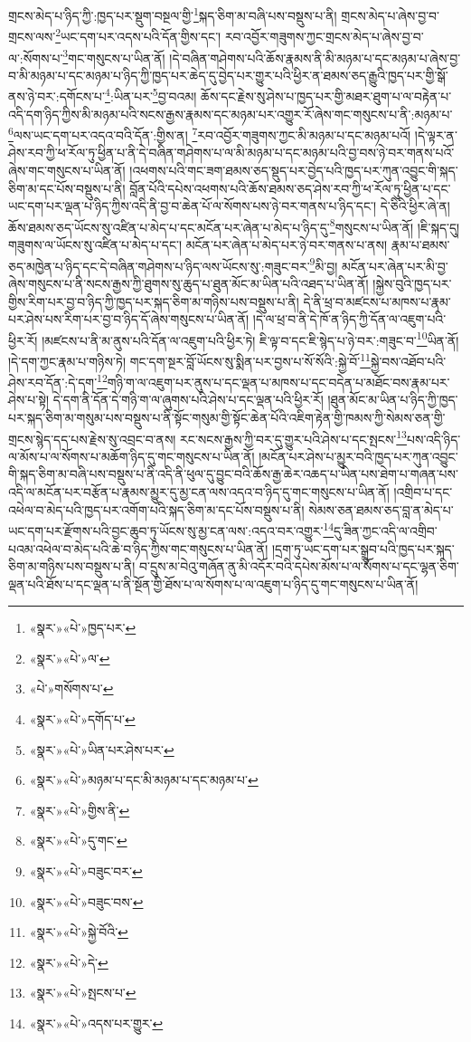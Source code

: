 གྲངས་མེད་པ་ཉིད་ཀྱི་:ཁྱད་པར་སྡུག་བསྔལ་གྱི་\footnote{«སྣར་»«པེ་»ཁྱད་པར་}སྐད་ཅིག་མ་བཞི་པས་བསྡུས་པ་ནི། གྲངས་མེད་པ་ཞེས་བྱ་བ་གྲངས་ལས་\footnote{«སྣར་»«པེ་»ལ་}ཡང་དག་པར་འདས་པའི་དོན་གྱིས་དང་། རབ་འབྱོར་གཟུགས་ཀྱང་གྲངས་མེད་པ་ཞེས་བྱ་བ་ལ་:སོགས་པ་\footnote{«པེ་»གསོགས་པ་}གང་གསུངས་པ་ཡིན་ནོ། །དེ་བཞིན་གཤེགས་པའི་ཆོས་རྣམས་ནི་མི་མཉམ་པ་དང་མཉམ་པ་ཞེས་བྱ་བ་མི་མཉམ་པ་དང་མཉམ་པ་ཉིད་ཀྱི་ཁྱད་པར་ཆེད་དུ་བྱེད་པར་གྱུར་པའི་ཕྱིར་ན་ཐམས་ཅད་རྒྱུའི་ཁྱད་པར་གྱི་སྒོ་ནས་ཉེ་བར་:དགོངས་པ་\footnote{«སྣར་»«པེ་»དགོད་པ་}:ཡིན་པར་\footnote{«སྣར་»«པེ་»ཡིན་པར་ཤེས་པར་}བྱ་བའམ། ཆོས་དང་རྗེས་སུ་ཤེས་པ་ཁྱད་པར་གྱི་མཐར་ཐུག་པ་ལ་བརྟེན་པ་འདི་དག་ཉིད་ཀྱིས་མི་མཉམ་པའི་སངས་རྒྱས་རྣམས་དང་མཉམ་པར་འགྱུར་རོ་ཞེས་གང་གསུངས་པ་ནི་:མཉམ་པ་\footnote{«སྣར་»«པེ་»མཉམ་པ་དང་མི་མཉམ་པ་དང་མཉམ་པ་}ལས་ཡང་དག་པར་འདའ་བའི་དོན་:གྱིས་ན། \footnote{«སྣར་»«པེ་»གྱིས་ནི་}རབ་འབྱོར་གཟུགས་ཀྱང་མི་མཉམ་པ་དང་མཉམ་པའོ། །དེ་ལྟར་ན་ཤེས་རབ་ཀྱི་ཕ་རོལ་ཏུ་ཕྱིན་པ་ནི་དེ་བཞིན་གཤེགས་པ་ལ་མི་མཉམ་པ་དང་མཉམ་པའི་བྱ་བས་ཉེ་བར་གནས་པའོ་ཞེས་གང་གསུངས་པ་ཡིན་ནོ། །འཕགས་པའི་གང་ཟག་ཐམས་ཅད་སྡུད་པར་བྱེད་པའི་ཁྱད་པར་ཀུན་འབྱུང་གི་སྐད་ཅིག་མ་དང་པོས་བསྡུས་པ་ནི། བློན་པོའི་དཔེས་འཕགས་པའི་ཆོས་ཐམས་ཅད་ཤེས་རབ་ཀྱི་ཕ་རོལ་ཏུ་ཕྱིན་པ་དང་ཡང་དག་པར་ལྡན་པ་ཉིད་ཀྱིས་འདི་ནི་བྱ་བ་ཆེན་པོ་ལ་སོགས་པས་ཉེ་བར་གནས་པ་ཉིད་དང་། དེ་ཅིའི་ཕྱིར་ཞེ་ན། ཆོས་ཐམས་ཅད་ཡོངས་སུ་འཛིན་པ་མེད་པ་དང་མངོན་པར་ཞེན་པ་མེད་པ་ཉིད་དུ་\footnote{«སྣར་»«པེ་»དུ་གང་}གསུངས་པ་ཡིན་ནོ། །ཇི་སྐད་དུ། གཟུགས་ལ་ཡོངས་སུ་འཛིན་པ་མེད་པ་དང་། མངོན་པར་ཞེན་པ་མེད་པར་ཉེ་བར་གནས་པ་ནས། རྣམ་པ་ཐམས་ཅད་མཁྱེན་པ་ཉིད་དང་དེ་བཞིན་གཤེགས་པ་ཉིད་ལས་ཡོངས་སུ་:གཟུང་བར་\footnote{«སྣར་»«པེ་»བཟུང་བར་}མི་བྱ། མངོན་པར་ཞེན་པར་མི་བྱ་ཞེས་གསུངས་པ་ནི་སངས་རྒྱས་ཀྱི་ཐུགས་སུ་ཆུད་པ་ཐུན་མོང་མ་ཡིན་པའི་འཐད་པ་ཡིན་ནོ། །སྐྱེས་བུའི་ཁྱད་པར་གྱིས་རིག་པར་བྱ་བ་ཉིད་ཀྱི་ཁྱད་པར་སྐད་ཅིག་མ་གཉིས་པས་བསྡུས་པ་ནི། དེ་ནི་ཕྲ་བ་མཛངས་པ་མཁས་པ་རྣམ་པར་ཤེས་པས་རིག་པར་བྱ་བ་ཉིད་དོ་ཞེས་གསུངས་པ་ཡིན་ནོ། །དེ་ལ་ཕྲ་བ་ནི་དེ་ཁོ་ན་ཉིད་ཀྱི་དོན་ལ་འཇུག་པའི་ཕྱིར་རོ། །མཛངས་པ་ནི་མ་ནུས་པའི་དོན་ལ་འཇུག་པའི་ཕྱིར་ཏེ། ཇི་ལྟ་བ་དང་ཇི་སྙེད་པ་ཉེ་བར་:གཟུང་བ་\footnote{«སྣར་»«པེ་»བཟུང་བས་}ཡིན་ནོ། །དེ་དག་ཀྱང་རྣམ་པ་གཉིས་ཏེ། གང་དག་སྔར་བློ་ཡོངས་སུ་སྨིན་པར་བྱས་པ་སོ་སོའི་:སྐྱེ་བོ་\footnote{«སྣར་»«པེ་»སྐྱེ་བོའི་}སྐྱེ་བས་འཐོབ་པའི་ཤེས་རབ་དོན་:དེ་དག་\footnote{«སྣར་»«པེ་»དེ་}གཉི་ག་ལ་འཇུག་པར་ནུས་པ་དང་ལྡན་པ་མཁས་པ་དང་བདེན་པ་མཐོང་བས་རྣམ་པར་ཤེས་པ་སྟེ། དེ་དག་ནི་དོན་དེ་གཉི་ག་ལ་ཞུགས་པའི་ཤེས་པ་དང་ལྡན་པའི་ཕྱིར་རོ། །ཐུན་མོང་མ་ཡིན་པ་ཉིད་ཀྱི་ཁྱད་པར་སྐད་ཅིག་མ་གསུམ་པས་བསྡུས་པ་ནི་སྟོང་གསུམ་གྱི་སྟོང་ཆེན་པོའི་འཇིག་རྟེན་གྱི་ཁམས་ཀྱི་སེམས་ཅན་གྱི་གྲངས་སྙེད་དད་པས་རྗེས་སུ་འབྲང་བ་ནས། རང་སངས་རྒྱས་ཀྱི་བར་དུ་གྱུར་པའི་ཤེས་པ་དང་སྤངས་\footnote{«སྣར་»«པེ་»སྤངས་པ་}པས་འདི་ཉིད་ལ་མོས་པ་ལ་སོགས་པ་མཆོག་ཉིད་དུ་གང་གསུངས་པ་ཡིན་ནོ། །མངོན་པར་ཤེས་པ་མྱུར་བའི་ཁྱད་པར་ཀུན་འབྱུང་གི་སྐད་ཅིག་མ་བཞི་པས་བསྡུས་པ་ནི་འདི་ནི་ཕུལ་དུ་བྱུང་བའི་ཆོས་རྒྱ་ཆེར་འཆད་པ་ཡིན་པས་ཐེག་པ་གཞན་པས་འདི་ལ་མངོན་པར་བརྩོན་པ་རྣམས་མྱུར་དུ་མྱ་ངན་ལས་འདའ་བ་ཉིད་དུ་གང་གསུངས་པ་ཡིན་ནོ། །འགྲིབ་པ་དང་འཕེལ་བ་མེད་པའི་ཁྱད་པར་འགོག་པའི་སྐད་ཅིག་མ་དང་པོས་བསྡུས་པ་ནི། སེམས་ཅན་ཐམས་ཅད་བླ་ན་མེད་པ་ཡང་དག་པར་རྫོགས་པའི་བྱང་ཆུབ་ཏུ་ཡོངས་སུ་མྱ་ངན་ལས་:འདའ་བར་འགྱུར་\footnote{«སྣར་»«པེ་»འདས་པར་གྱུར་}དུ་ཟིན་ཀྱང་འདི་ལ་འགྲིབ་པའམ་འཕེལ་བ་མེད་པའི་ཆེ་བ་ཉིད་ཀྱིས་གང་གསུངས་པ་ཡིན་ནོ། །དྲག་ཏུ་ཡང་དག་པར་སྒྲུབ་པའི་ཁྱད་པར་སྐད་ཅིག་མ་གཉིས་པས་བསྡུས་པ་ནི། བ་དྲུས་མ་བེའུ་གཞོན་ནུ་མི་འདོར་བའི་དཔེས་མོས་པ་ལ་སོགས་པ་དང་ལྷན་ཅིག་ལྡན་པའི་ཐོས་པ་དང་ལྡན་པ་ནི་སྔོན་གྱི་ཐོས་པ་ལ་སོགས་པ་ལ་འཇུག་པ་ཉིད་དུ་གང་གསུངས་པ་ཡིན་ནོ། 